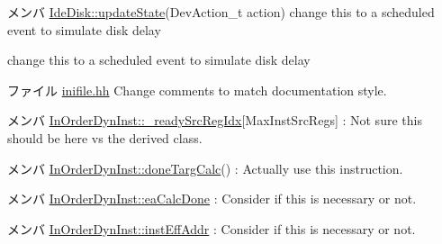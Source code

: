 \label{todo__todo000060}
\hypertarget{todo__todo000060}{}
 
\begin{DoxyDescription}
\item[メンバ \hyperlink{classIdeDisk_a24fb6794cfae6f84b380080e7501959e}{IdeDisk::updateState}(DevAction\_\-t action) ]change this to a scheduled event to simulate disk delay 

change this to a scheduled event to simulate disk delay 
\end{DoxyDescription}

\label{todo__todo000006}
\hypertarget{todo__todo000006}{}
 
\begin{DoxyDescription}
\item[ファイル \hyperlink{inifile_8hh}{inifile.hh} ]Change comments to match documentation style. 
\end{DoxyDescription}

\label{todo__todo000017}
\hypertarget{todo__todo000017}{}
 
\begin{DoxyDescription}
\item[メンバ \hyperlink{classInOrderDynInst_a125f1037e43155d592320e6c70a09b6b}{InOrderDynInst::\_\-readySrcRegIdx}\mbox{[}MaxInstSrcRegs\mbox{]} ]: Not sure this should be here vs the derived class. 
\end{DoxyDescription}

\label{todo__todo000018}
\hypertarget{todo__todo000018}{}
 
\begin{DoxyDescription}
\item[メンバ \hyperlink{classInOrderDynInst_a9a56f3bdfd0d5b331356265c62556516}{InOrderDynInst::doneTargCalc}() ]: Actually use this instruction. 
\end{DoxyDescription}

\label{todo__todo000021}
\hypertarget{todo__todo000021}{}
 
\begin{DoxyDescription}
\item[メンバ \hyperlink{classInOrderDynInst_a4c89b34e605b9d5398d51e8d754035de}{InOrderDynInst::eaCalcDone} ]: Consider if this is necessary or not. 
\end{DoxyDescription}

\label{todo__todo000020}
\hypertarget{todo__todo000020}{}
 
\begin{DoxyDescription}
\item[メンバ \hyperlink{classInOrderDynInst_aaa54d2440fad0984a0a8edbcade8c26f}{InOrderDynInst::instEffAddr} ]: Consider if this is necessary or not. 
\end{DoxyDescription}

